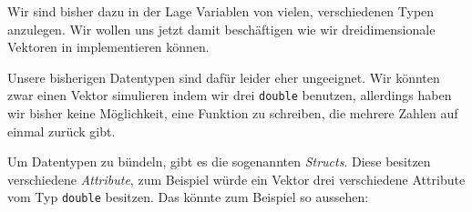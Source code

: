 
Wir sind bisher dazu in der Lage Variablen von vielen, verschiedenen Typen anzulegen.
Wir wollen uns jetzt damit beschäftigen wie wir dreidimensionale Vektoren in \Cpp implementieren können.

Unsere bisherigen Datentypen sind dafür leider eher ungeeignet.
Wir könnten zwar einen Vektor simulieren indem wir drei \texttt{double} benutzen, allerdings haben wir bisher keine Möglichkeit, eine Funktion zu schreiben, die mehrere Zahlen auf einmal zurück gibt.

Um Datentypen zu bündeln, gibt es die sogenannten \emph{Structs}.
Diese besitzen verschiedene \emph{Attribute}, zum Beispiel würde ein Vektor drei verschiedene Attribute vom Typ \texttt{double} besitzen.
Das könnte zum Beispiel so aussehen:


%

